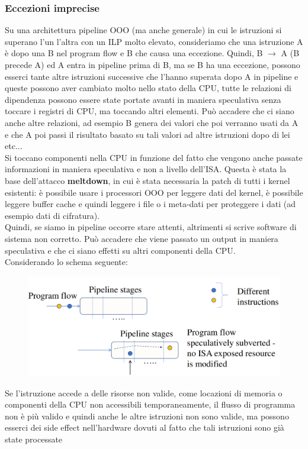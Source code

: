 \documentclass[12pt, oneside]{extbook}
\begin{document}
\subsubsection{Eccezioni imprecise}
Su una architettura pipeline OOO (ma anche generale) in cui le istruzioni si superano l'un l'altra con un ILP molto elevato, consideriamo che una istruzione A è dopo una B nel program flow e B che causa una eccezione. Quindi, B $\rightarrow$ A (B precede A) ed A entra in pipeline prima di B, ma se B ha una eccezione, possono esserci tante altre istruzioni successive che l'hanno superata dopo A in pipeline e queste possono aver cambiato molto nello stato della CPU, tutte le relazioni di dipendenza possono essere state portate avanti in maniera speculativa senza toccare i registri di CPU, ma toccando altri elementi. Può accadere che ci siano anche altre relazioni, ad esempio B genera dei valori che poi verranno usati da A e che A poi passi il risultato basato su tali valori ad altre istruzioni dopo di lei etc... \\ Si toccano componenti nella CPU in funzione del fatto che vengono anche passate informazioni in maniera speculativa e non a livello dell'ISA. Questa è stata la base dell'attacco \textbf{meltdown}, in cui è stata necessaria la patch di tutti i kernel esistenti: è possibile usare i processori OOO per leggere dati del kernel, è possibile leggere buffer cache e quindi leggere i file o i meta-dati per proteggere i dati (ad esempio dati di cifratura).
\\ Quindi, se siamo in pipeline occorre stare attenti, altrimenti si scrive software di sistema non corretto. Può accadere che viene passato un output in maniera speculativa e che ci siano effetti su altri componenti della CPU. \\ Considerando lo schema seguente:
\begin{figure}[!ht]
\includegraphics[scale=0.15]{immagini/not_valid_instr}
\end{figure}
Se l'istruzione accede a delle risorse non valide, come locazioni di memoria o componenti della CPU non accessibili temporaneamente, il flusso di programma non è più valido e quindi anche le altre istruzioni non sono valide, ma possono esserci dei side effect nell'hardware dovuti al fatto che tali istruzioni sono già state processate
\end{document}

